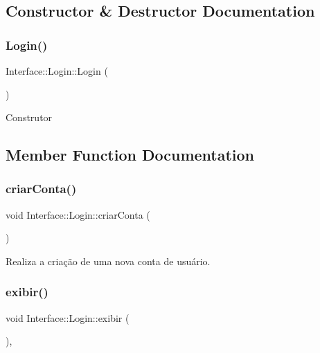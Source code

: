 \subsection{Constructor \& Destructor Documentation}
\mbox{\label{class_interface_1_1_login_ab0fdc87ab4af1504a687e7a4a0c860be}} 
\subsubsection{\texorpdfstring{Login()}{Login()}}
{\footnotesize\ttfamily Interface\+::\+Login\+::\+Login (\begin{DoxyParamCaption}{ }\end{DoxyParamCaption})}

Construtor 

\subsection{Member Function Documentation}
\mbox{\label{class_interface_1_1_login_aab280108f0fba4ef1d848ab2922d628a}} 
\subsubsection{\texorpdfstring{criar\+Conta()}{criarConta()}}
{\footnotesize\ttfamily void Interface\+::\+Login\+::criar\+Conta (\begin{DoxyParamCaption}{ }\end{DoxyParamCaption})\hspace{0.3cm}{\ttfamily [private]}}



Realiza a criação de uma nova conta de usuário. 

\mbox{\label{class_interface_1_1_login_a5db83876c6d264c4b61121e0e0b9ca38}} 
\subsubsection{\texorpdfstring{exibir()}{exibir()}}
{\footnotesize\ttfamily void Interface\+::\+Login\+::exibir (\begin{DoxyParamCaption}{ }\end{DoxyParamCaption})\hspace{0.3cm}{\ttfamily [override]}, {\ttfamily [virtual]}}



